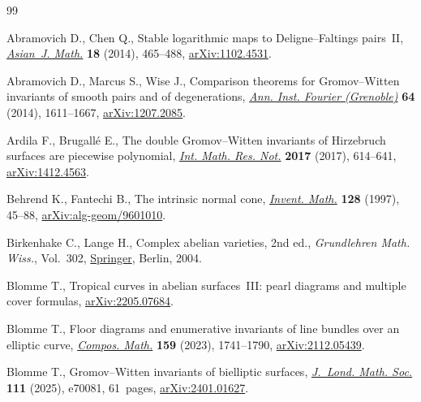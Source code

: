\documentclass[pdftex]{sigma}
\numberwithin{equation}{section}
\theoremstyle{definition}
\begin{document}
\begin{thebibliography}{99}
\footnotesize\itemsep=0pt

Abramovich D., Chen Q., Stable logarithmic maps to {D}eligne--{F}altings
 pairs~{II},
 \href{https://doi.org/10.4310/AJM.2014.v18.n3.a5}{\textit{Asian~J. Math.}}
 \textbf{18} (2014), 465--488,
 \href{http://arxiv.org/abs/1102.4531}{arXiv:1102.4531}.

Abramovich D., Marcus S., Wise J., Comparison theorems for {G}romov--{W}itten
 invariants of smooth pairs and of degenerations,
 \href{https://doi.org/10.5802/aif.2892}{\textit{Ann. Inst. Fourier
 (Grenoble)}} \textbf{64} (2014), 1611--1667,
 \href{http://arxiv.org/abs/1207.2085}{arXiv:1207.2085}.

Ardila F., Brugall\'e E., The double {G}romov--{W}itten invariants of
 {H}irzebruch surfaces are piecewise polynomial,
 \href{https://doi.org/10.1093/imrn/rnv379}{\textit{Int. Math. Res. Not.}}
 \textbf{2017} (2017), 614--641,
 \href{http://arxiv.org/abs/1412.4563}{arXiv:1412.4563}.

Behrend K., Fantechi B., The intrinsic normal cone,
 \href{https://doi.org/10.1007/s002220050136}{\textit{Invent. Math.}}
 \textbf{128} (1997), 45--88,
 \href{http://arxiv.org/abs/alg-geom/9601010}{arXiv:alg-geom/9601010}.

Birkenhake C., Lange H., Complex abelian varieties, 2nd ed., \textit{Grundlehren Math.
 Wiss.}, Vol.~302,
 \href{https://doi.org/10.1007/978-3-662-06307-1}{Springer}, Berlin, 2004.

Blomme T., Tropical curves in abelian surfaces~{III}: pearl diagrams and
 multiple cover formulas,
 \href{http://arxiv.org/abs/2205.07684}{arXiv:2205.07684}.

Blomme T., Floor diagrams and enumerative invariants of line bundles over an
 elliptic curve,
 \href{https://doi.org/10.1112/s0010437x23007285}{\textit{Compos. Math.}}
 \textbf{159} (2023), 1741--1790,
 \href{http://arxiv.org/abs/2112.05439}{arXiv:2112.05439}.

Blomme T., Gromov--{W}itten invariants of bielliptic surfaces,
 \href{https://doi.org/10.1112/jlms.70081}{\textit{J.~Lond. Math. Soc.}}
 \textbf{111} (2025), e70081, 61~pages,
 \href{http://arxiv.org/abs/2401.01627}{arXiv:2401.01627}.


\end{thebibliography}
\end{document}
